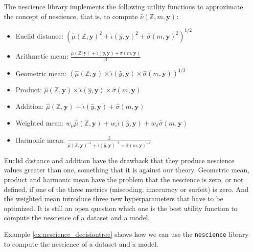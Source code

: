 \begin{remark}
The nescience library implements the following utility functions to approximate the concept of nescience, that is, to compute $\hat\nu\left(\mathbb{Z}, m, \mathbf{y} \right)$:

\begin{itemize}
\item Euclid distance: $\left( \hat\mu(\mathbb{Z}, \mathbf{y})^2 + \hat\iota(\hat{y}, \mathbf{y})^2  + \hat\sigma(m, \mathbf{y})^2 \right)^{1/2}$
\item Arithmetic mean: $\frac{\hat\mu(\mathbb{Z}, \mathbf{y}) + \hat\iota(\hat{y}, \mathbf{y}) + \hat\sigma(m, \mathbf{y})}{3}$
\item Geometric mean: $\left( \hat\mu(\mathbb{Z}, \mathbf{y}) \times \hat\iota(\hat{y}, \mathbf{y}) \times \hat\sigma(m, \mathbf{y}) \right)^{1/3}$
\item Product: $\hat\mu(\mathbb{Z}, \mathbf{y}) \times \hat\iota(\hat{y}, \mathbf{y}) \times \hat\sigma(m, \mathbf{y})$
\item Addition: $\hat\mu(\mathbb{Z}, \mathbf{y}) + \hat\iota(\hat{y}, \mathbf{y}) + \hat\sigma(m, \mathbf{y})$
\item Weighted mean: $w_\mu \hat\mu(\mathbb{Z}, \mathbf{y}) + w_\iota \hat\iota(\hat{y}, \mathbf{y}) + w_\sigma \hat\sigma(m, \mathbf{y})$
\item Harmonic mean: $\frac{3}{ \hat\mu(\mathbb{Z}, \mathbf{y})^{-1} + \hat\iota(\hat{y}, \mathbf{y})^{-1} + \hat\sigma(m, \mathbf{y})^{-1} }$
\end{itemize}

Euclid distance and addition have the drawback that they produce nescience values greater than one, something that it is against our theory. Geometric mean, product and harmonic mean have the problem that the nescience is zero, or not defined, if one of the three metrics (miscoding, inaccuracy or surfeit) is zero. And the weighted mean introduce three new hyperparameters that have to be optimized. It is still an open question which one is the best utility function to compute the nescience of a dataset and a model.
\end{remark}

Example \ref{ex:nescience_decisiontree} shows how we can use the \texttt{nescience} library to compute the nescience of a dataset and a model.

